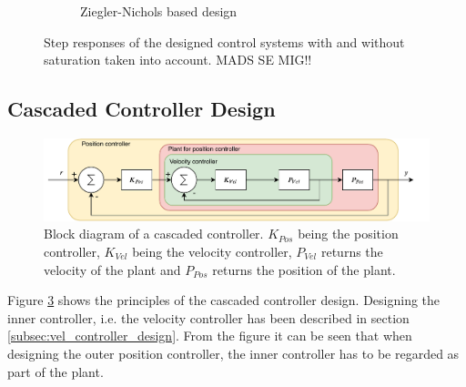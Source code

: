 \documentclass[../../main.tex]{subfiles}
\begin{document}
\begin{figure}[]
\begin{subfigure}{0.48\textwidth}
    \caption{Ziegler-Nichols based design}
    \label{fig:step_vel_ZN}
\end{subfigure}
\caption{Step responses of the designed control systems with and without saturation taken into account. MADS SE MIG!!}
\label{fig:vel_step}
\end{figure}




\subsection{Cascaded Controller Design}
\begin{figure}[]
    \centering
    \includegraphics[width = 0.7 \textwidth]{Sections/System_Design/Images/cascade_controller.pdf}
    \caption{Block diagram of a cascaded controller. $K_{Pos}$ being the position controller, $K_{Vel}$ being the velocity controller, $P_{Vel}$ returns the velocity of the plant and $P_{Pos}$ returns the position of the plant.}
    \label{fig:cascaded_design}
\end{figure}
Figure \ref{fig:cascaded_design} shows the principles of the cascaded controller design. Designing the inner controller, i.e. the velocity controller has been described in section \ref{subsec:vel_controller_design}. From the figure it can be seen that when designing the outer position controller, the inner controller has to be regarded as part of the plant. 
\end{document}
